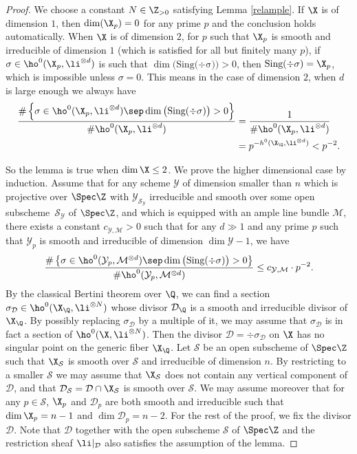 \begin{proof}
We choose a constant $N\in \Z_{>0}$ satisfying Lemma \ref{relample}. If $\X$ is of dimension $1$, then $\dim(\X_p)=0$ for any prime $p$ and the conclusion holds automatically. When $\X$ is of dimension $2$, for $p$ such that $\X_p$ is smooth and irreducible of dimension $1$ (which is satisfied for all but finitely many $p$), if $\sigma\in \ho^0(\X_p, \li^{\otimes d})$ is such that $\dim\big(\mathrm{Sing(\div \sigma})\big)>0$, then $\mathrm{Sing(\div \sigma})=\X_p$, which is impossible unless $\sigma=0$. This means in the case of dimension $2$, when $d$ is large enough we always have
\begin{align*}
\frac{\#\left\{ \sigma\in \ho^0(\X_p, \li^{\otimes d})\sep \dim\big(\mathrm{Sing(\div \sigma})\big)>0 \right\}}{\#\ho^0(\X_p, \li^{\otimes d})}&=\frac{1}{\#\ho^0(\X_p, \li^{\otimes d})}\\
&=p^{-h^0(\X_{\Q},\li^{\otimes d})}<p^{-2}.
\end{align*}

So the lemma is true when $\dim \X\leq 2$. We prove the higher dimensional case by induction. Assume that for any scheme $\mathcal{Y}$ of dimension smaller than $n$ which is projective over $\Spec \Z$ with $\mathcal{Y}_{\mathcal{S}_{\mathcal{Y}}}$ irreducible and smooth over some open subscheme~$\mathcal{S}_{\mathcal{Y}}$ of $\Spec \Z$, and which is equipped with an ample line bundle $\mathcal{M}$, there exists a constant $c_{\mathcal{Y},\mathcal{M}}>0$ such that for any $d\gg 1$ and any prime $p$ such that $\mathcal{Y}_p$ is smooth and irreducible of dimension $\dim\mathcal{Y}-1$, we have
\[
\frac{\#\left\{ \sigma\in \ho^0(\mathcal{Y}_p, \mathcal{M}^{\otimes d})\sep \dim\big(\mathrm{Sing(\div \sigma})\big)>0 \right\}}{\#\ho^0(\mathcal{Y}_p, \mathcal{M}^{\otimes d})}\leq c_{\mathcal{Y},\mathcal{M}}\cdot p^{-2}.
\]
By the classical Bertini theorem over $\Q$, we can find a section $\sigma_{\mathcal{D}}\in \ho^0(\X_{\Q}, \li^{\otimes N})$ whose divisor $\mathcal D_{\Q}$ is a smooth and irreducible divisor of $\X_{\Q}$. By possibly replacing $\sigma_{\mathcal D}$ by a multiple of it, we may assume that $\sigma_{\mathcal D}$ is in fact a section of $ \ho^0(\X, \li^{\otimes N})$. Then the divisor $\mathcal{D}=\div \sigma_{\mathcal{D}}$ on $\X$ has no singular point on the generic fiber $\X_{\Q}$. Let $\mathcal{S}$ be an open subscheme of $\Spec \Z$ such that $\X_{\mathcal{S}}$ is smooth over $\mathcal{S}$ and irreducible of dimension $n$. By restricting to a smaller $\mathcal{S}$ we may assume that $\X_{\mathcal{S}}$ does not contain any vertical component of $\mathcal{D}$, and that $\mathcal{D}_{\mathcal{S}}=\mathcal{D}\cap \X_{\mathcal{S}}$ is smooth over $\mathcal{S}$. We may assume moreover that for any $p\in \mathcal{S}$, $\X_p$ and $\mathcal{D}_p$ are both smooth and irreducible such that $\dim\X_p=n-1$ and $\dim\mathcal{D}_p=n-2$. For the rest of the proof, we fix the divisor $\mathcal{D}$. Note that $\mathcal{D}$ together with the open subscheme $\mathcal{S}$ of $\Spec \Z$ and the restriction sheaf $\li|_{\mathcal{D}}$ also satisfies the assumption of the lemma.


\end{proof}
